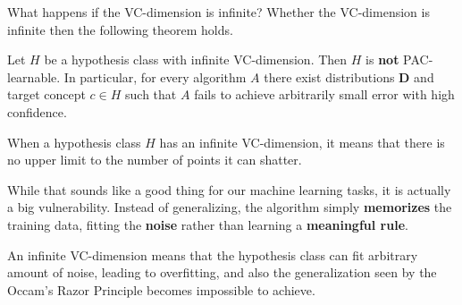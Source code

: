 What happens if the VC-dimension is infinite? Whether the VC-dimension is infinite then the following theorem holds. \vspace{7pt}
\begin{definition}[title = Theorem]
    Let $H$ be a hypothesis class with infinite VC-dimension. Then $H$ is \textbf{not} PAC-learnable. In particular, for every algorithm $A$ there 
    exist distributions $\boldsymbol{D}$ and target concept $c \in H$ such that $A$ fails to achieve arbitrarily small error with high confidence.
\end{definition}
When a hypothesis class $H$ has an infinite VC-dimension, it means that there is no upper limit to the number of points it can shatter. \vspace{7pt}

While that sounds like a good thing for our machine learning tasks, it is actually a big vulnerability. Instead of generalizing, the algorithm simply 
\textbf{memorizes} the training data, fitting the \textbf{noise} rather than learning a \textbf{meaningful rule}. \vspace{7pt}

An infinite VC-dimension means that the hypothesis class can fit arbitrary amount of noise, leading to overfitting, and also the generalization 
seen by the Occam's Razor Principle becomes impossible to achieve.